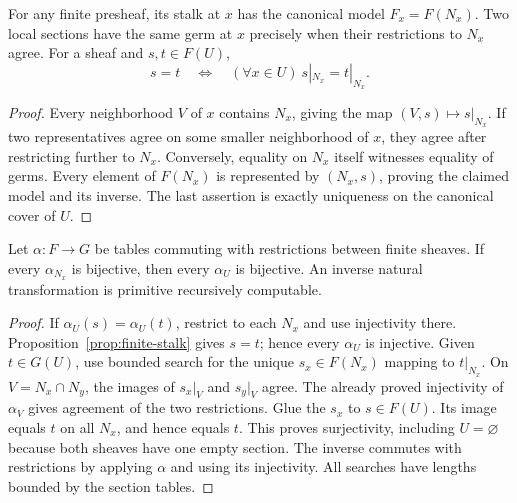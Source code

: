\begin{proposition}
\label{prop:finite-stalk}
For any finite presheaf, its stalk at $x$ has the canonical model
$F_x=F(N_x)$.  Two local sections have the same germ at $x$ precisely when
their restrictions to $N_x$ agree.  For a sheaf and $s,t\in F(U)$,
\[
 s=t\quad\Longleftrightarrow\quad
       (\forall x\in U)\ s|_{N_x}=t|_{N_x}.
\]
\end{proposition}
\begin{proof}
Every neighborhood $V$ of $x$ contains $N_x$, giving the map
$(V,s)\mapsto s|_{N_x}$.  If two representatives agree on some smaller
neighborhood of $x$, they agree after restricting further to $N_x$.
Conversely, equality on $N_x$ itself witnesses equality of germs.
Every element of $F(N_x)$ is represented by $(N_x,s)$, proving the
claimed model and its inverse.  The last assertion is exactly uniqueness
on the canonical cover of $U$.
\end{proof}

\begin{theorem}
Let $\alpha:F\to G$ be tables commuting with restrictions between finite
sheaves.  If every $\alpha_{N_x}$ is bijective, then every $\alpha_U$ is
bijective.  An inverse natural transformation is primitive recursively
computable.
\end{theorem}
\begin{proof}
If $\alpha_U(s)=\alpha_U(t)$, restrict to each $N_x$ and use injectivity
there.  Proposition~\ref{prop:finite-stalk} gives $s=t$; hence every
$\alpha_U$ is injective.  Given $t\in G(U)$, use bounded search for the
unique $s_x\in F(N_x)$ mapping to $t|_{N_x}$.  On
$V=N_x\cap N_y$, the images of $s_x|_V$ and $s_y|_V$ agree.  The
already proved injectivity of $\alpha_V$ gives agreement of the two
restrictions.  Glue the $s_x$ to $s\in F(U)$.  Its image equals $t$ on
all $N_x$, and hence equals $t$.  This proves surjectivity, including
$U=\varnothing$ because both sheaves have one empty section.
The inverse commutes with restrictions by applying $\alpha$ and using
its injectivity.  All searches have lengths bounded by the section
tables.
\end{proof}


